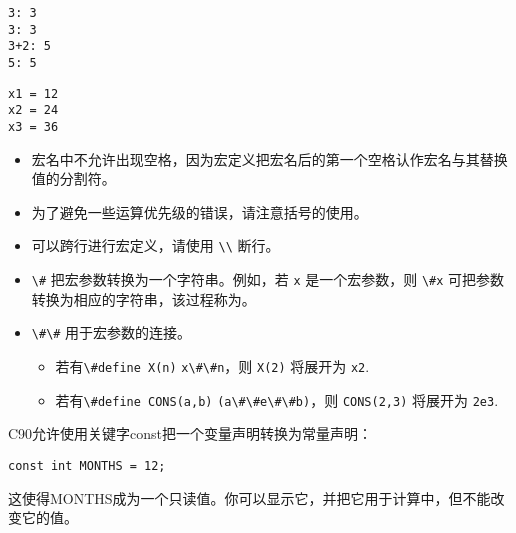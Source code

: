 \begin{frame}[fragile]

  
  \pause 
  \begin{lstlisting}
3: 3
3: 3
3+2: 5
5: 5
  \end{lstlisting}
\end{frame}


\begin{frame}[fragile]

  
  \pause 
  \begin{lstlisting}
x1 = 12
x2 = 24
x3 = 36
\end{lstlisting}
\end{frame}

\begin{frame}
  \begin{free}[注意]{}
    \begin{itemize}
    \item 宏名中不允许出现空格，因为宏定义把宏名后的第一个空格认作宏名与其替换值的分割符。
    \item 为了避免一些运算优先级的错误，请注意括号的使用。
    \item 可以跨行进行宏定义，请使用 \lstinline|\\| 断行。
    \end{itemize}
  \end{free}

  \pause 
  \begin{free}{}  
    \begin{itemize}
    \item \lstinline|\#| 把宏参数转换为一个字符串。例如，若 \lstinline|x| 是一个宏参数，则 \lstinline|\#x| 可把参数转换为相应的字符串，该过程称为。
    \item \lstinline|\#|\lstinline|\#| 用于宏参数的连接。
      \begin{itemize}
      \item 若有\lstinline|\#define X(n)| \lstinline|x\#\#n|，则 \lstinline|X(2)| 将展开为 \lstinline|x2|.
      \item 若有\lstinline|\#define CONS(a,b)| \lstinline|(a\#\#e\#\#b)|，则 \lstinline|CONS(2,3)| 将展开为 \lstinline|2e3|.
      \end{itemize}
    \end{itemize}

  \end{free}
\end{frame}

\begin{frame}[fragile]
C90允许使用关键字const把一个变量声明转换为常量声明：
\begin{lstlisting}
const int MONTHS = 12; 
\end{lstlisting}
这使得MONTHS成为一个只读值。你可以显示它，并把它用于计算中，但不能改变它的值。
\end{frame}
